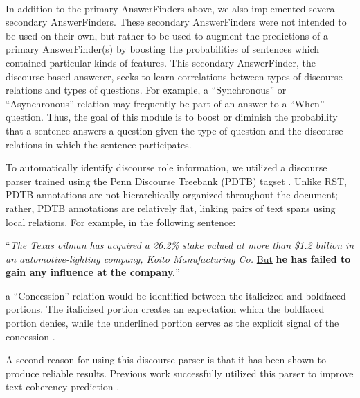 \documentclass[11pt,letterpaper]{article}
\begin{document}
\paragraph{}

In addition to the primary AnswerFinders above, we also implemented several secondary AnswerFinders. These secondary AnswerFinders were not intended to be used on their own, but rather to be used to augment the predictions of a primary AnswerFinder(s) by boosting the probabilities of sentences which contained particular kinds of features. This secondary AnswerFinder, the discourse-based answerer, seeks to learn correlations between types of discourse relations and types of questions. For example, a ``Synchronous'' or ``Asynchronous'' relation may frequently be part of an answer to a ``When'' question. Thus, the goal of this module is to boost or diminish the probability that a sentence answers a question given the type of question and the discourse relations in which the sentence participates.

To automatically identify discourse role information, we utilized a discourse parser trained using the Penn Discourse Treebank (PDTB) tagset \cite{lin_2010_discourse_parser_pdtb}. Unlike RST, PDTB annotations are not hierarchically organized throughout the document; rather, PDTB annotations are relatively flat, linking pairs of text spans using local relations. For example, in the following sentence:

``\textit{The Texas oilman has acquired a 26.2\% stake valued at more than \$1.2 billion in an automotive-lighting company, Koito Manufacturing Co.} \underline{But} \textbf{he has failed to gain any influence at the company.}''

a ``Concession'' relation would be identified between the italicized and boldfaced portions. The italicized portion creates an expectation which the boldfaced portion denies, while the underlined portion serves as the explicit signal of the concession \cite{pdtb_corpus}.

A second reason for using this discourse parser is that it has been shown to produce reliable results. Previous work successfully utilized this parser to improve text coherency prediction \cite{lin_2010_coherence_discourse_relations}. 
\end{document}
